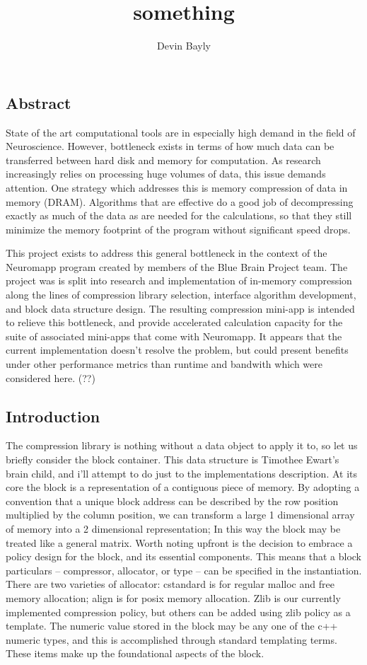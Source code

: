 \documentclass[12pt,twocolumn]{article}
\title{something}
\author{Devin Bayly}
\begin{document}
\subsection{Abstract}\label{abstract}

State of the art computational tools are in especially high demand in
the field of Neuroscience. However, bottleneck exists in terms of how
much data can be transferred between hard disk and memory for
computation. As research increasingly relies on processing huge volumes
of data, this issue demands attention. One strategy which addresses this
is memory compression of data in memory (DRAM). Algorithms that are
effective do a good job of decompressing exactly as much of the data as
are needed for the calculations, so that they still minimize the memory
footprint of the program without significant speed drops.

This project exists to address this general bottleneck in the context of
the Neuromapp program created by members of the Blue Brain Project team.
The project was is split into research and implementation of in-memory
compression along the lines of compression library selection, interface
algorithm development, and block data structure design. The resulting
compression mini-app is intended to relieve this bottleneck, and provide
accelerated calculation capacity for the suite of associated mini-apps
that come with Neuromapp. It appears that the current implementation
doesn't resolve the problem, but could present benefits under other
performance metrics than runtime and bandwith which were considered
here. (??)

\subsection{Introduction}\label{introduction}

The compression library is nothing without a data object to apply it to,
so let us briefly consider the block container. This data structure is
Timothee Ewart's brain child, and i'll attempt to do just to the
implementations description. At its core the block is a representation
of a contiguous piece of memory. By adopting a convention that a unique
block address can be described by the row position multiplied by the
column position, we can transform a large 1 dimensional array of memory
into a 2 dimensional representation; In this way the block may be
treated like a general matrix. Worth noting upfront is the decision to
embrace a policy design for the block, and its essential components.
This means that a block particulars -- compressor, allocator, or type --
can be specified in the instantiation. There are two varieties of
allocator: cstandard is for regular malloc and free memory allocation;
align is for posix memory allocation. Zlib is our currently implemented
compression policy, but others can be added using zlib policy as a
template. The numeric value stored in the block may be any one of the
c++ numeric types, and this is accomplished through standard templating
terms. These items make up the foundational aspects of the block.
\end{document}
